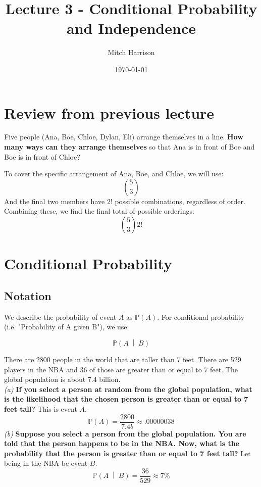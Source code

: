 \documentclass[titlepage, 12pt, leqno]{article}
\title{\Huge{Lecture 3 - Conditional Probability and Independence}}
\author{\large{Mitch Harrison}}
\date{\today}
\begin{document}
\setlength{\parskip}{1\baselineskip}
\setlength{\parindent}{15pt}
\maketitle
\tableofcontents
\newpage


\section{Review from previous lecture}

\begin{ex}
    Five people (Ana, Boe, Chloe, Dylan, Eli) arrange themselves in a line. \textbf{How many ways can they arrange themselves} so that Ana is in front of Boe and Boe is in front of Chloe?

To cover the specific arrangement of Ana, Boe, and Chloe, we will use:
\[
    \binom{5}{3}
\]
And the final two members have $2!$ possible combinations, regardless of order. Combining these, we find the final total of possible orderings:
\[
    \boxed{\binom{5}{3}2!}
\]
\end{ex}
\pagebreak
\section{Conditional Probability}
\subsection{Notation}
We describe the probability of event $A$ as $\mathbb{P}(A)$. For conditional probability (i.e. "Probability of A given B"), we use:

\[
    \mathbb{P}\left(A \;\middle|\; B\right) 
\]
\begin{ex}
    There are 2800 people in the world that are taller than 7 feet. There are 529 players in the NBA and 36 of those are greater than or equal to 7 feet. The global population is about 7.4 billion. \\
    \textit{(a)} \textbf{If you select a person at random from the global population, what is the likelihood that the chosen person is greater than or equal to 7 feet tall?} This is event $A$.
    \[
    \boxed{\mathbb{P}(A) = \frac{2800}{7.4b} \approx .00000038}
    \]
    \textit{(b)} \textbf{Suppose you select a person from the global population. You are told that the person happens to be in the NBA. Now, what is the probability that the person is greater than or equal to 7 feet tall?} Let being in the NBA be event $B$.
    \[
        \mathbb{P}\left(A \;\middle|\; B\right) = \frac{36}{529} \approx 7\%
    \]
\end{ex}
\end{document}
